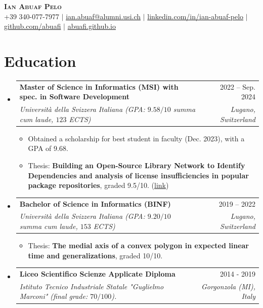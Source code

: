 \documentclass[letterpaper,11pt]{article}
\makeatletter
\newcommand{\resumeItem}[1]{
  \item\small{
    {#1 \vspace{-2pt}}
  }
}
\newcommand{\resumeSubheading}[4]{
  \vspace{-2pt}\item
    \begin{tabular*}{0.97\textwidth}[t]{l@{\extracolsep{\fill}}r}
      \textbf{#1} & #2 \\
      \textit{\small#3} & \textit{\small #4} \\
    \end{tabular*}\vspace{-7pt}
}
\newcommand{\resumeSubHeadingListStart}{\begin{itemize}[leftmargin=0.15in, label={}]}
\newcommand{\resumeSubHeadingListEnd}{\end{itemize}}
\newcommand{\resumeItemListStart}{\begin{itemize}}
\newcommand{\resumeItemListEnd}{\end{itemize}\vspace{-5pt}}
\makeatother
\begin{document}

\begin{center}
    \textbf{\Huge \scshape Ian Abuaf Pelo} \\ \vspace{1pt}
    \small +39 340-077-7977 $|$ \href{mailto:ian.abuaf@alumni.usi.ch}{ian.abuaf@alumni.usi.ch} $|$ 
    \href{https://www.linkedin.com/in/ian-abuaf-pelo}{linkedin.com/in/ian-abuaf-pelo} $|$
    \href{https://github.com/abuafi}{github.com/abuafi} $|$
    \href{https://abuafi.github.io}{abuafi.github.io}
\end{center}


\section{Education}
\resumeSubHeadingListStart
  \resumeSubheading
  {Master of Science in Informatics (MSI) with spec. in Software Development}
  {2022 -- Sep. 2024}
  {Università della Svizzera Italiana (GPA: $9.58/10$ summa cum laude, $123$ ECTS)}
  {Lugano, Switzerland}
  \resumeItemListStart
    \resumeItem{Obtained a scholarship for best student in faculty (Dec. 2023), with a GPA of 9.68.}
    \resumeItem{Thesis: \textbf{Building an Open-Source Library Network to Identify Dependencies and analysis of
    license insufficiencies in popular package repositories}, graded 9.5/10. (\href{https://thesis.bul.sbu.usi.ch/theses/2331-2324AbuafPelo/pdf}{link})}
  \resumeItemListEnd
  \resumeSubheading
  {Bachelor of Science in Informatics (BINF) }
  {2019 -- 2022}
  {Università della Svizzera Italiana (GPA: $9.20/10$ summa cum laude, $153$ ECTS)}
  {Lugano, Switzerland}
  \resumeItemListStart
  \resumeItem{Thesis: \textbf{The medial axis of a convex polygon in expected linear time and generalizations}, graded 10/10.}
  \resumeItemListEnd
\vspace{-15px}
\resumeSubheading
  {Liceo Scientifico Scienze Applicate Diploma}
  {2014 - 2019}
  {Istituto Tecnico Industriale Statale "Guglielmo Marconi" (final grade: $70/100$).}
  {Gorgonzola (MI), Italy}
\resumeSubHeadingListEnd
\end{document}
